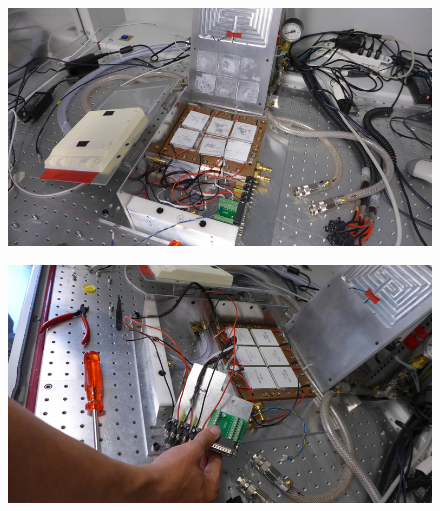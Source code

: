 \documentclass[a4paper,12pt,twoside]{article}
\begin{document}
\begin{appendices}
\begin{figure} [h!]
\centering
\begin{minipage}{.48\textwidth}
  \centering
  \includegraphics[width=\textwidth]{./Figures/Point6.png}
  \label{Step6}
\end{minipage}%
\hspace{2mm}
\begin{minipage}{.48\textwidth}
  \centering
  \includegraphics[width=\textwidth]{./Figures/Point7.png}
  \label{Step7}
\end{minipage}
\end{figure}


\end{appendices}
\end{document}
